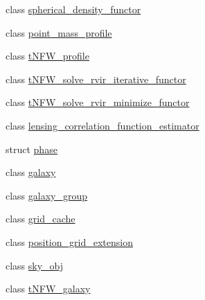 \begin{DoxyCompactItemize}
\item 
class \hyperlink{classIceBRG_1_1spherical__density__functor}{spherical\-\_\-density\-\_\-functor}
\item 
class \hyperlink{classIceBRG_1_1point__mass__profile}{point\-\_\-mass\-\_\-profile}
\item 
class \hyperlink{classIceBRG_1_1tNFW__profile}{t\-N\-F\-W\-\_\-profile}
\item 
class \hyperlink{classIceBRG_1_1tNFW__solve__rvir__iterative__functor}{t\-N\-F\-W\-\_\-solve\-\_\-rvir\-\_\-iterative\-\_\-functor}
\item 
class \hyperlink{classIceBRG_1_1tNFW__solve__rvir__minimize__functor}{t\-N\-F\-W\-\_\-solve\-\_\-rvir\-\_\-minimize\-\_\-functor}
\item 
class \hyperlink{classIceBRG_1_1lensing__correlation__function__estimator}{lensing\-\_\-correlation\-\_\-function\-\_\-estimator}
\item 
struct \hyperlink{structIceBRG_1_1phase}{phase}
\item 
class \hyperlink{classIceBRG_1_1galaxy}{galaxy}
\item 
class \hyperlink{classIceBRG_1_1galaxy__group}{galaxy\-\_\-group}
\item 
class \hyperlink{classIceBRG_1_1grid__cache}{grid\-\_\-cache}
\item 
class \hyperlink{classIceBRG_1_1position__grid__extension}{position\-\_\-grid\-\_\-extension}
\item 
class \hyperlink{classIceBRG_1_1sky__obj}{sky\-\_\-obj}
\item 
class \hyperlink{classIceBRG_1_1tNFW__galaxy}{t\-N\-F\-W\-\_\-galaxy}
\end{DoxyCompactItemize}
